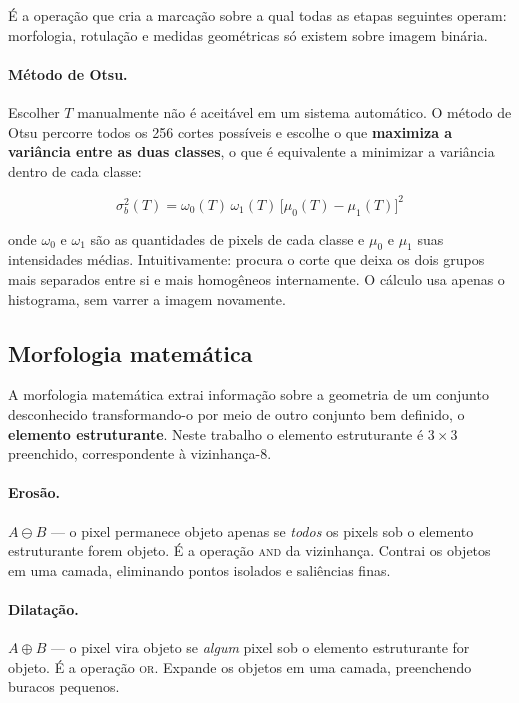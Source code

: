 \documentclass[12pt,a4paper]{article}
\begin{document}
É a operação que cria a marcação sobre a qual todas as etapas seguintes
operam: morfologia, rotulação e medidas geométricas só existem sobre imagem
binária.

\paragraph{Método de Otsu.} Escolher $T$ manualmente não é aceitável em um
sistema automático. O método de Otsu percorre todos os 256 cortes possíveis e
escolhe o que \textbf{maximiza a variância entre as duas classes}, o que é
equivalente a minimizar a variância dentro de cada classe:

\begin{equation}
\sigma_b^2(T) = \omega_0(T)\,\omega_1(T)\,\big[\mu_0(T) - \mu_1(T)\big]^2
\end{equation}

\noindent onde $\omega_0$ e $\omega_1$ são as quantidades de pixels de cada
classe e $\mu_0$ e $\mu_1$ suas intensidades médias. Intuitivamente: procura o
corte que deixa os dois grupos mais separados entre si e mais homogêneos
internamente. O cálculo usa apenas o histograma, sem varrer a imagem
novamente.

\subsection{Morfologia matemática}

A morfologia matemática extrai informação sobre a geometria de um conjunto
desconhecido transformando-o por meio de outro conjunto bem definido, o
\textbf{elemento estruturante}. Neste trabalho o elemento estruturante é
$3\times3$ preenchido, correspondente à vizinhança-8.

\paragraph{Erosão.} $A \ominus B$ --- o pixel permanece objeto apenas se
\emph{todos} os pixels sob o elemento estruturante forem objeto. É a operação
\textsc{and} da vizinhança. Contrai os objetos em uma camada, eliminando
pontos isolados e saliências finas.

\paragraph{Dilatação.} $A \oplus B$ --- o pixel vira objeto se \emph{algum}
pixel sob o elemento estruturante for objeto. É a operação \textsc{or}.
Expande os objetos em uma camada, preenchendo buracos pequenos.
\end{document}
